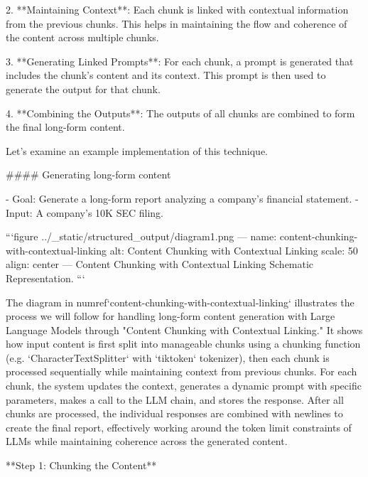 {{2. **Maintaining Context**: Each chunk is linked with contextual information from the previous chunks. This helps in maintaining the flow and coherence of the content across multiple chunks.

3. **Generating Linked Prompts**: For each chunk, a prompt is generated that includes the chunk's content and its context. This prompt is then used to generate the output for that chunk.

4. **Combining the Outputs**: The outputs of all chunks are combined to form the final long-form content.

Let's examine an example implementation of this technique.

#### Generating long-form content

- Goal: Generate a long-form report analyzing a company's financial statement.
- Input: A company's 10K SEC filing.

```{figure} ../_static/structured_output/diagram1.png
---
name: content-chunking-with-contextual-linking
alt: Content Chunking with Contextual Linking
scale: 50%
align: center
---
Content Chunking with Contextual Linking Schematic Representation.
```

The diagram in {numref}`content-chunking-with-contextual-linking` illustrates the process we will follow for handling long-form content generation with Large Language Models through "Content Chunking with Contextual Linking." It shows how input content is first split into manageable chunks using a chunking function (e.g. `CharacterTextSplitter` with `tiktoken` tokenizer), then each chunk is processed sequentially while maintaining context from previous chunks. For each chunk, the system updates the context, generates a dynamic prompt with specific parameters, makes a call to the LLM chain, and stores the response. After all chunks are processed, the individual responses are combined with newlines to create the final report, effectively working around the token limit constraints of LLMs while maintaining coherence across the generated content.

**Step 1: Chunking the Content**

}}
